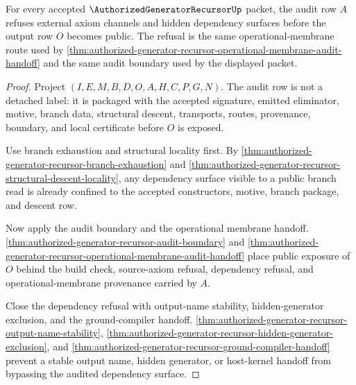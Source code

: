 \begin{theorem}
\label{thm:authorized-generator-recursor-audit-dependency-refusal}
For every accepted $\AuthorizedGeneratorRecursorUp$ packet, the audit row $A$
refuses external axiom channels and hidden dependency surfaces before the
output row $O$ becomes public. The refusal is the same operational-membrane
route used by \autoref{thm:authorized-generator-recursor-operational-membrane-audit-handoff}
and the same audit boundary used by the displayed packet.
\end{theorem}
\begin{proof}
Project $(I,E,M,B,D,O,A,H,C,P,G,N)$. The audit row is not a detached label: it
is packaged with the accepted signature, emitted eliminator, motive, branch
data, structural descent, transports, routes, provenance, boundary, and local
certificate before $O$ is exposed.

Use branch exhaustion and structural locality first. By
\autoref{thm:authorized-generator-recursor-branch-exhaustion} and
\autoref{thm:authorized-generator-recursor-structural-descent-locality}, any
dependency surface visible to a public branch read is already confined to the
accepted constructors, motive, branch package, and descent row.

Now apply the audit boundary and the operational membrane handoff.
\autoref{thm:authorized-generator-recursor-audit-boundary} and
\autoref{thm:authorized-generator-recursor-operational-membrane-audit-handoff}
place public exposure of $O$ behind the build check, source-axiom refusal,
dependency refusal, and operational-membrane provenance carried by $A$.

Close the dependency refusal with output-name stability, hidden-generator
exclusion, and the ground-compiler handoff.
\autoref{thm:authorized-generator-recursor-output-name-stability},
\autoref{thm:authorized-generator-recursor-hidden-generator-exclusion}, and
\autoref{thm:authorized-generator-recursor-ground-compiler-handoff} prevent a
stable output name, hidden generator, or host-kernel handoff from bypassing the
audited dependency surface.
\end{proof}

